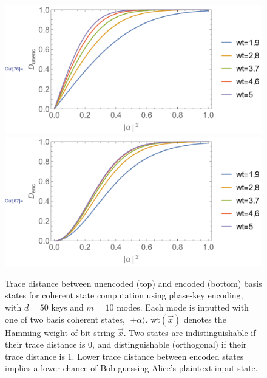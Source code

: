 \documentclass[aps, rmp, twocolumn, amsmath, amssymb, nofootinbib, superscriptaddress, longbibliography, floatfix, table-of-contents, eqsecnum]{revtex4-1}
\newcommand{\ket}[1]{|#1\rangle}
\begin{document}
\begin{figure}[!htb]
\includegraphics[width=\columnwidth]{coherent_state_homo_unenc} \\
\includegraphics[width=\columnwidth]{coherent_state_homo_enc}
\caption{Trace distance between unencoded (top) and encoded (bottom) basis states for coherent state computation using phase-key encoding, with \mbox{$d=50$} keys and \mbox{$m=10$} modes. Each mode is inputted with one of two basis coherent states, \mbox{$\ket{\pm\alpha}$}. \mbox{$\text{wt}(\vec{x})$} denotes the Hamming weight of bit-string $\vec{x}$. Two states are indistinguishable if their trace distance is 0, and distinguishable (orthogonal) if their trace distance is 1. Lower trace distance between encoded states implies a lower chance of Bob guessing Alice's plaintext input state.} \label{fig:homo_coh_st_tr}
\end{figure}
\end{document}
